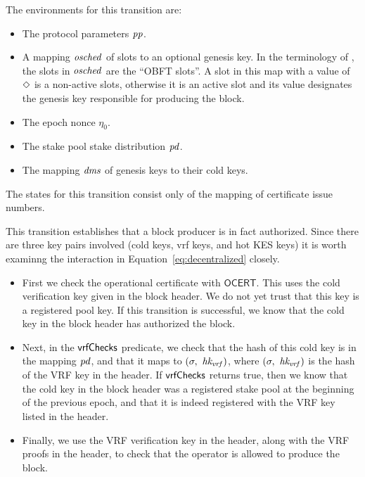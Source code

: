 The environments for this transition are:
\begin{itemize}
  \item The protocol parameters $\mathit{pp}$.
  \item A mapping $\mathit{osched}$ of slots to an optional genesis key.
    In the terminology of \cite{delegation_design},
    the slots in $\mathit{osched}$ are the ``OBFT slots''.
    A slot in this map with a value of $\Diamond$ is a non-active slots,
    otherwise it is an active slot and its value designates the genesis key
    responsible for producing the block.
  \item The epoch nonce $\eta_0$.
  \item The stake pool stake distribution $\mathit{pd}$.
  \item The mapping $\mathit{dms}$ of genesis keys to their cold keys.
\end{itemize}

The states for this transition consist only of the mapping of certificate issue numbers.

This transition establishes that a block producer is in fact authorized.
Since there are three key pairs involved (cold keys, vrf keys, and hot KES keys)
it is worth examinng the interaction in Equation~\ref{eq:decentralized} closely.

\begin{itemize}
  \item First we check the operational certificate with $\mathsf{OCERT}$.
  This uses the cold verification key given in the block header.
  We do not yet trust that this key is a registered pool key.
  If this transition is successful, we know that the cold key in the block header has authorized
  the block.
\item  Next, in the $\mathsf{vrfChecks}$ predicate, we check that the hash of this cold key is in the
  mapping $\mathit{pd}$, and that it maps to $(\sigma,~\mathit{hk_{vrf}})$, where
  $(\sigma,~\mathit{hk_{vrf}})$ is the hash of the VRF key in the header.
  If $\mathsf{vrfChecks}$ returns true, then we know that the cold key in the block header was a
  registered stake pool at the beginning of the previous epoch, and that it is indeed registered
  with the VRF key listed in the header.
\item Finally, we use the VRF verification key in the header, along with the VRF proofs in the
  header, to check that the operator is allowed to produce the block.
\end{itemize}

